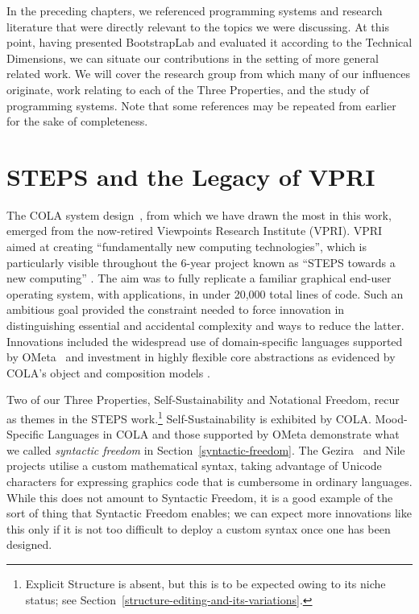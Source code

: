 \documentclass[ twoside,openright,titlepage,numbers=noenddot,headinclude,footinclude,cleardoublepage=empty,abstract=on,
                BCOR=5mm,paper=a4,fontsize=11pt
                ]{scrreprt}
\theoremstyle{definition}
\begin{document}
In the preceding chapters, we referenced programming systems and
research literature that were directly relevant to the topics we were
discussing. At this point, having presented BootstrapLab and evaluated
it according to the Technical Dimensions, we can situate our
contributions in the setting of more general related work. We will cover
the research group from which many of our influences originate, work
relating to each of the Three Properties, and the study of programming
systems. Note that some references may be repeated from earlier for the
sake of completeness.

\hypertarget{steps-and-the-legacy-of-vpri}{\section{STEPS and the Legacy of
VPRI}\label{steps-and-the-legacy-of-vpri}}

The \ac{COLA} system design~\parencite{COLAs}, from which we have drawn
the most in this work, emerged from the now-retired Viewpoints Research
Institute (VPRI). VPRI aimed at creating ``fundamentally new computing
technologies'', which is particularly visible throughout the 6-year
project known as ``STEPS towards a new computing''
\parencite{Steps08,Steps09,Steps10,Steps11,Steps12}. The aim was to
fully replicate a familiar graphical end-user operating system, with
applications, in under 20,000 total lines of code. Such an ambitious
goal provided the constraint needed to force innovation in
distinguishing essential and accidental complexity and ways to reduce
the latter. Innovations included the widespread use of domain-specific
languages supported by OMeta~\parencite{OMeta} and investment in highly
flexible core abstractions as evidenced by \ac{COLA}'s object and
composition models \parencite{OROM,OECM}.

Two of our Three Properties, Self-Sustainability and Notational Freedom,
recur as themes in the STEPS work.\footnote{Explicit Structure is
  absent, but this is to be expected owing to its niche status; see
  Section~\ref{structure-editing-and-its-variations}.}
Self-Sustainability is exhibited by \ac{COLA}. Mood-Specific Languages
in \ac{COLA} and those supported by OMeta demonstrate what we called
\emph{syntactic freedom} in Section~\ref{syntactic-freedom}. The
Gezira~\parencite{Gezira} and Nile~\parencite{Nile} projects utilise a
custom mathematical syntax, taking advantage of Unicode characters for
expressing graphics code that is cumbersome in ordinary languages. While
this does not amount to Syntactic Freedom, it is a good example of the
sort of thing that Syntactic Freedom enables; we can expect more
innovations like this only if it is not too difficult to deploy a custom
syntax once one has been designed.
\end{document}
